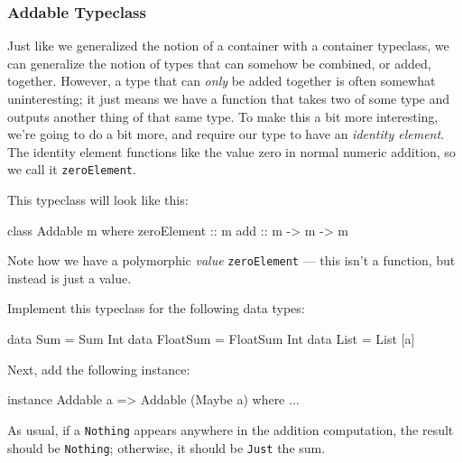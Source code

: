 \documentclass{article}
\begin{document}
\subsubsection*{Addable Typeclass}
Just like we generalized the notion of a container with a container typeclass, we can generalize the
notion of types that can somehow be combined, or added, together. However, a type that can
\emph{only} be added together is often somewhat uninteresting; it just means we have a function that
takes two of some type and outputs another thing of that same type. To make this a bit more
interesting, we're going to do a bit more, and require our type to have an \emph{identity element}.
The identity element functions like the value zero in normal numeric addition, so we call it
\texttt{zeroElement}.

This typeclass will look like this:
\begin{haskellcode}
class Addable m where
  zeroElement :: m
  add :: m -> m -> m
\end{haskellcode}
Note how we have a polymorphic \emph{value} \texttt{zeroElement} --- this isn't a function, but
instead is just a value.

Implement this typeclass for the following data types:
\begin{haskellcode}
data Sum = Sum Int
data FloatSum = FloatSum Int
data List = List [a]
\end{haskellcode}

Next, add the following instance:
\begin{haskellcode}
instance Addable a => Addable (Maybe a) where
  ...
\end{haskellcode}
As usual, if a \texttt{Nothing} appears anywhere in the addition computation, the result should be
\texttt{Nothing}; otherwise, it should be \texttt{Just} the sum.
\end{document}
